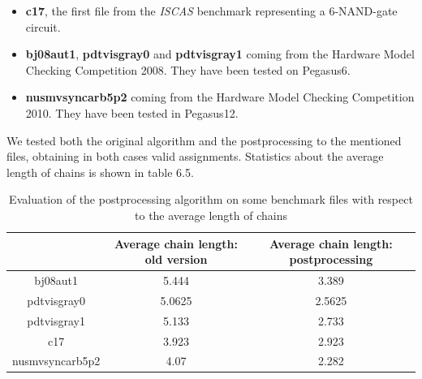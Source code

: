 \begin{itemize}
    \item \textbf{c17}, the first file from the \textit{ISCAS} benchmark representing a 6-NAND-gate circuit.
    \item \textbf{bj08aut1}, \textbf{pdtvisgray0} and \textbf{pdtvisgray1} coming from the Hardware Model Checking Competition 2008. They have been tested on Pegasus6.
    \item \textbf{nusmvsyncarb5p2} coming from the Hardware Model Checking Competition 2010. They have been tested in Pegasus12.
\end{itemize}

We tested both the original algorithm and the postprocessing to the mentioned files, obtaining in both cases valid assignments. Statistics about the average length of chains is shown in table 6.5.

\begin{table}[hbt!]
\centering
\begin{tabular}{|c|c|c|}
\hline
                                    & \cellcolor[HTML]{FFFE65}Average chain length: old version & \cellcolor[HTML]{FFFE65}Average chain length: postprocessing \\ \hline
\cellcolor[HTML]{00D2CB}bj08aut1    & 5.444                                                     & 3.389                                                        \\ \hline
\cellcolor[HTML]{00D2CB}pdtvisgray0 & 5.0625                                                    & 2.5625                                                       \\ \hline
\cellcolor[HTML]{00D2CB}pdtvisgray1 & 5.133                                                     & 2.733                                                        \\ \hline
\cellcolor[HTML]{00D2CB}c17         & 3.923                                                     & 2.923                                                        \\ \hline
\cellcolor[HTML]{00D2CB}nusmvsyncarb5p2 & 4.07 & 2.282
\end{tabular}
\caption{Evaluation of the postprocessing algorithm on some benchmark files with respect to the average length of chains}
\end{table}


\newpage

